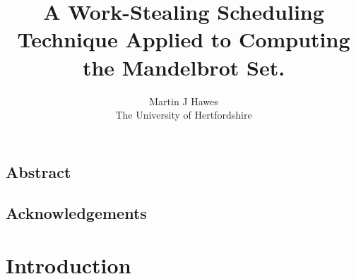 

\title{
\huge A Work-Stealing Scheduling Technique Applied to Computing the Mandelbrot Set.
}

\author{
  Martin J Hawes\\
  The University of Hertfordshire \\
}



\maketitle
\date{}

\section{Abstract}

\section{Acknowledgements}

\tableofcontents

\chapter{Introduction}

